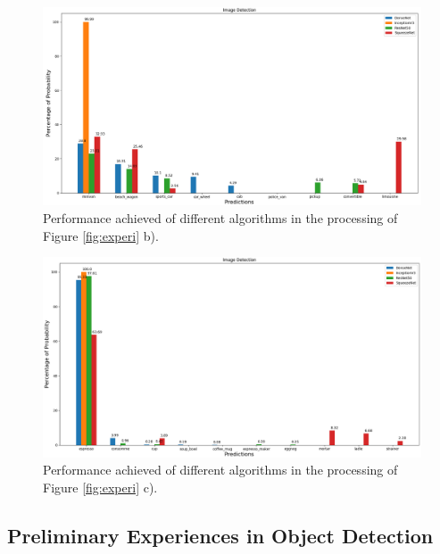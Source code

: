 \begin{figure}[H]
  \centering
  \includegraphics[width=\textwidth]{Sections/4InitialWork/4_images/run3_res.png}
  \caption[Performance achieved of different algorithms]{Performance achieved of different algorithms in the processing of Figure \ref{fig:experi} b).}
  \label{fig:exp2}
\end{figure}



\begin{figure}[H]
  \centering
  \includegraphics[width=\textwidth]{Sections/4InitialWork/4_images/run4_res.png}
  \caption[Performance achieved of different algorithms]{Performance achieved of different algorithms in the processing of Figure \ref{fig:experi} c).}
  \label{fig:exp3}
\end{figure}


\newpage







  \subsection{Preliminary Experiences in Object Detection}
  \label{sec:object_test}


